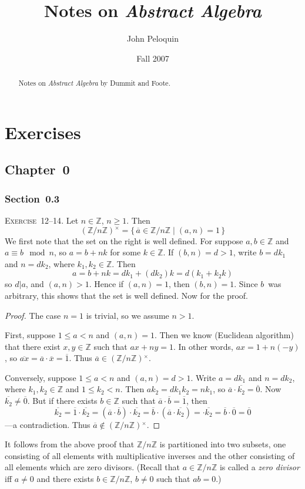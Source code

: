 \documentclass[letterpaper]{article}
\title{Notes on \emph{Abstract Algebra}}
\author{John Peloquin}
\date{Fall 2007}
\newcommand{\exercise}[1]{\goodbreak\noindent\textsc{Exercise~{#1}.}}
\newcommand{\Z}{\mathbb{Z}}
\newcommand{\congr}{\equiv}
\newcommand{\mi}[1]{{#1}{}^{\times}}
\newcommand{\res}[1]{\overline{#1}}
\renewcommand{\gcd}[2]{({#1},{#2})}
\begin{document}
\maketitle
\begin{abstract}
Notes on \emph{Abstract Algebra} by Dummit and Foote.
\end{abstract}
\section*{Exercises}
\subsection*{Chapter~0}
\subsubsection*{Section~0.3}
\exercise{12--14} Let $n\in\Z$, $n\ge1$. Then
$$\mi{(\Z/n\Z)}=\{\,\res{a}\in\Z/n\Z\mid\gcd{a}{n}=1\,\}$$
We first note that the set on the right is well defined. For suppose $a,b\in\Z$ and $a\congr b\mod n$, so $a=b+nk$ for some $k\in\Z$. If $\gcd{b}{n}=d>1$, write $b=dk_1$ and $n=dk_2$, where $k_1,k_2\in\Z$. Then
$$a=b+nk=dk_1+(dk_2)k=d(k_1+k_2k)$$
so $d|a$, and $\gcd{a}{n}>1$. Hence if $\gcd{a}{n}=1$, then $\gcd{b}{n}=1$. Since $b$~was arbitrary, this shows that the set is well defined. Now for the proof.

\begin{proof}
The case $n=1$ is trivial, so we assume $n>1$.

First, suppose $1\le a<n$ and $\gcd{a}{n}=1$. Then we know (Euclidean algorithm) that there exist $x,y\in\Z$ such that $ax+ny=1$. In other words, $ax=1+n(-y)$, so $\res{ax}=\res{a}\cdot\res{x}=\res{1}$. Thus $\res{a}\in\mi{(\Z/n\Z)}$.

Conversely, suppose $1\le a<n$ and $\gcd{a}{n}=d>1$. Write $a=dk_1$ and $n=dk_2$, where $k_1,k_2\in\Z$ and $1\le k_2<n$. Then $ak_2=dk_1k_2=nk_1$, so $\res{a}\cdot\res{k_2}=\res{0}$. Now $\res{k_2}\ne\res{0}$. But if there exists $b\in\Z$ such that $\res{a}\cdot\res{b}=\res{1}$, then
$$\res{k_2}=\res{1}\cdot\res{k_2}=(\res{a}\cdot\res{b})\cdot\res{k_2}=\res{b}\cdot(\res{a}\cdot\res{k_2})=\cdot\res{k_2}=\res{b}\cdot\res{0}=\res{0}$$
---a contradiction. Thus $\res{a}\not\in\mi{(\Z/n\Z)}$.
\end{proof}
It follows from the above proof that $\Z/n\Z$ is partitioned into two subsets, one consisting of all elements with multiplicative inverses and the other consisting of all elements which are zero divisors. (Recall that $a\in\Z/n\Z$ is called a \emph{zero divisor} iff $a\ne 0$ and there exists $b\in\Z/n\Z$, $b\ne0$ such that $ab=0$.)
\end{document}
